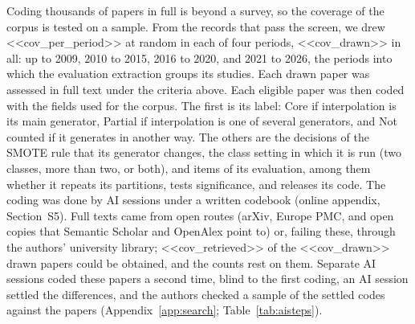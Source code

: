 Coding thousands of papers in full is beyond a survey, so the coverage of the corpus is tested on a sample. From the records that pass the screen, we drew <<cov_per_period>> at random in each of four periods, <<cov_drawn>> in all: up to 2009, 2010 to 2015, 2016 to 2020, and 2021 to 2026, the periods into which the evaluation extraction groups its studies. Each drawn paper was assessed in full text under the criteria above. Each eligible paper was then coded with the fields used for the corpus. The first is its label: Core if interpolation is its main generator, Partial if interpolation is one of several generators, and Not counted if it generates in another way. The others are the decisions of the SMOTE rule that its generator changes, the class setting in which it is run (two classes, more than two, or both), and items of its evaluation, among them whether it repeats its partitions, tests significance, and releases its code. The coding was done by AI sessions under a written codebook (online appendix, Section~S5). Full texts came from open routes (arXiv, Europe PMC, and open copies that Semantic Scholar and OpenAlex point to) or, failing these, through the authors' university library; <<cov_retrieved>> of the <<cov_drawn>> drawn papers could be obtained, and the counts rest on them. Separate AI sessions coded these papers a second time, blind to the first coding, an AI session settled the differences, and the authors checked a sample of the settled codes against the papers (Appendix~\ref{app:search}; Table~\ref{tab:aisteps}).
